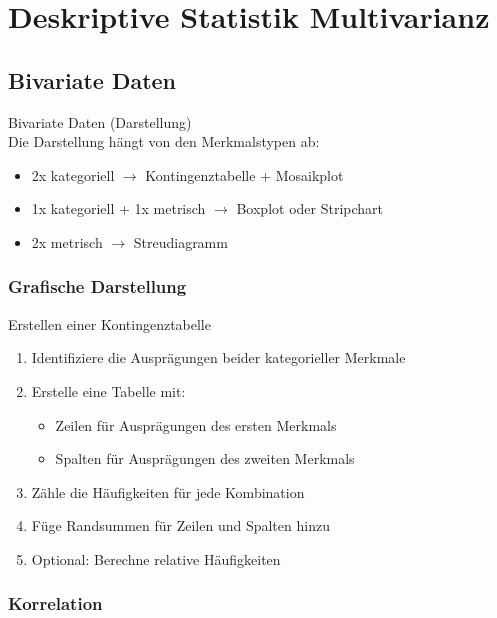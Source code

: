 \section{Deskriptive Statistik Multivarianz}

\subsection{Bivariate Daten}

\begin{definition}{Bivariate Daten (Darstellung)}\\
Die Darstellung hängt von den Merkmalstypen ab:
\begin{itemize}
  \item 2x kategoriell $\rightarrow$ Kontingenztabelle + Mosaikplot
  \item 1x kategoriell + 1x metrisch $\rightarrow$ Boxplot oder Stripchart
  \item 2x metrisch $\rightarrow$ Streudiagramm
\end{itemize}
\end{definition}

\subsubsection{Grafische Darstellung}

\begin{KR}{Erstellen einer Kontingenztabelle} %
\begin{enumerate}
    \item Identifiziere die Ausprägungen beider kategorieller Merkmale
    \item Erstelle eine Tabelle mit:
        \begin{itemize}
            \item Zeilen für Ausprägungen des ersten Merkmals
            \item Spalten für Ausprägungen des zweiten Merkmals
        \end{itemize}
    \item Zähle die Häufigkeiten für jede Kombination
    \item Füge Randsummen für Zeilen und Spalten hinzu
    \item Optional: Berechne relative Häufigkeiten
\end{enumerate}
\end{KR}



\subsubsection{Korrelation}

